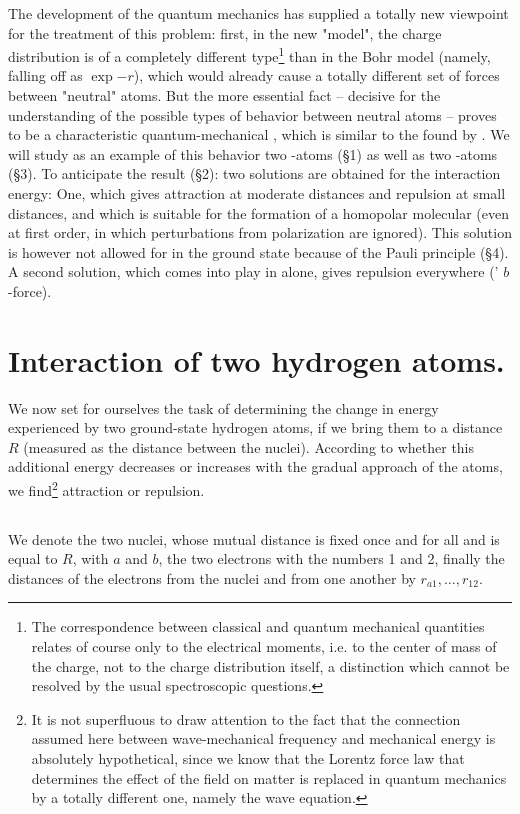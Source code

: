 \begin{paper}{1}
The development of the quantum mechanics has supplied a totally new viewpoint for the treatment of this problem: first, in the new "model", the charge distribution is of a completely different type\footnote{The correspondence between classical and quantum mechanical quantities relates of course only to the electrical moments, i.e. to the center of mass of the charge, not to the charge distribution itself, a distinction which cannot be resolved by the usual spectroscopic questions.} than in the Bohr model (namely, falling off as $\exp{-r}$), which would already cause a totally different set of forces between "neutral" atoms. But the more essential fact -- decisive for the understanding of the possible types of behavior between neutral atoms -- proves to be a characteristic quantum-mechanical , which is similar to the  found by \citeauthor{Heisenberg}. We will study as an example of this behavior two -atoms (\S1) as well as two -atoms (\S3). To anticipate the result (\S2): two solutions are obtained for the interaction energy: One, which gives attraction at moderate distances and repulsion at small distances, and which is suitable for the formation of a homopolar molecular (even at first order, in which perturbations from polarization are ignored). This solution is however not allowed for  in the ground state because of the Pauli principle (\S4). A second solution, which comes into play in  alone, gives repulsion everywhere (\citeauthor{van der Waals}' $b$-force).

\section{Interaction of two hydrogen atoms.} We now set for ourselves the task of determining the change in energy experienced by two ground-state hydrogen atoms, if we bring them to a distance $R$ (measured as the distance between the nuclei). According to whether this additional energy decreases or increases with the gradual approach of the atoms, we find\footnote{It is not superfluous to draw attention to the fact that the connection assumed here between wave-mechanical frequency and mechanical energy is absolutely hypothetical, since we know that the Lorentz force law that determines the effect of the field on matter is replaced in quantum mechanics by a totally different one, namely the wave equation.} attraction or repulsion.

\subsection{} We denote the two nuclei, whose mutual distance is fixed once and for all and is equal to $R$, with $a$ and $b$, the two electrons with the numbers 1 and 2, finally the distances of the electrons from the nuclei and from one another by $r_{a1}, \dots, r_{12}$.


\end{paper}
